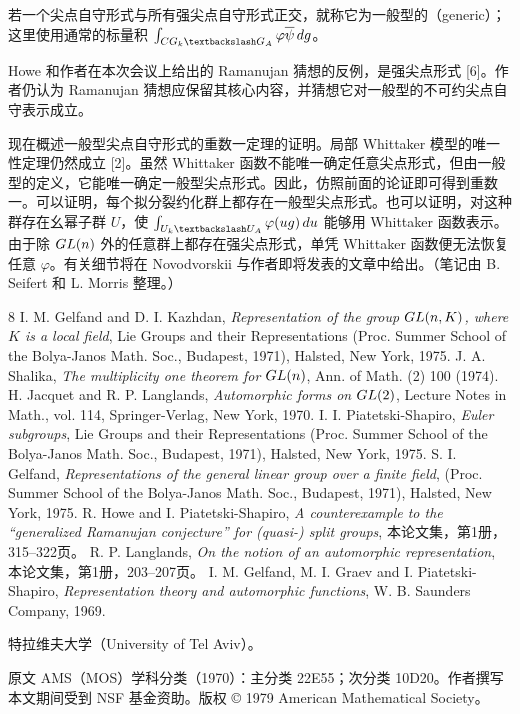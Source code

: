 若一个尖点自守形式与所有强尖点自守形式正交，就称它为一般型的（generic）；这里使用通常的标量积 $\int_{CG_k\backslash G_\A}\varphi\overline\psi\,dg$。

Howe 和作者在本次会议上给出的 Ramanujan 猜想的反例，是强尖点形式 [6]。作者仍认为 Ramanujan 猜想应保留其核心内容，并猜想它对一般型的不可约尖点自守表示成立。

现在概述一般型尖点自守形式的重数一定理的证明。局部 Whittaker 模型的唯一性定理仍然成立 [2]。虽然 Whittaker 函数不能唯一确定任意尖点形式，但由一般型的定义，它能唯一确定一般型尖点形式。因此，仿照前面的论证即可得到重数一。可以证明，每个拟分裂约化群上都存在一般型尖点形式。也可以证明，对这种群存在幺幂子群 $U$，使 $\int_{U_k\backslash U_\A}\varphi(ug)\,du$ 能够用 Whittaker 函数表示。由于除 $GL(n)$ 外的任意群上都存在强尖点形式，单凭 Whittaker 函数便无法恢复任意 $\varphi$。有关细节将在 Novodvorskii 与作者即将发表的文章中给出。（笔记由 B. Seifert 和 L. Morris 整理。）

\begin{thebibliography}{8}
 I. M. Gelfand and D. I. Kazhdan, \emph{Representation of the group $GL(n,K)$, where $K$ is a local field}, Lie Groups and their Representations (Proc. Summer School of the Bolya-Janos Math. Soc., Budapest, 1971), Halsted, New York, 1975.
 J. A. Shalika, \emph{The multiplicity one theorem for $GL(n)$}, Ann. of Math. (2) 100 (1974).
 H. Jacquet and R. P. Langlands, \emph{Automorphic forms on $GL(2)$}, Lecture Notes in Math., vol. 114, Springer-Verlag, New York, 1970.
 I. I. Piatetski-Shapiro, \emph{Euler subgroups}, Lie Groups and their Representations (Proc. Summer School of the Bolya-Janos Math. Soc., Budapest, 1971), Halsted, New York, 1975.
 S. I. Gelfand, \emph{Representations of the general linear group over a finite field}, (Proc. Summer School of the Bolya-Janos Math. Soc., Budapest, 1971), Halsted, New York, 1975.
 R. Howe and I. Piatetski-Shapiro, \emph{A counterexample to the ``generalized Ramanujan conjecture'' for (quasi-) split groups}, 本论文集，第1册，315--322页。
 R. P. Langlands, \emph{On the notion of an automorphic representation}, 本论文集，第1册，203--207页。
 I. M. Gelfand, M. I. Graev and I. Piatetski-Shapiro, \emph{Representation theory and automorphic functions}, W. B. Saunders Company, 1969.
\end{thebibliography}
\noindent 特拉维夫大学（University of Tel Aviv）。
\par\noindent\footnotesize 原文 AMS（MOS）学科分类（1970）：主分类 22E55；次分类 10D20。作者撰写本文期间受到 NSF 基金资助。版权 © 1979 American Mathematical Society。\normalsize
